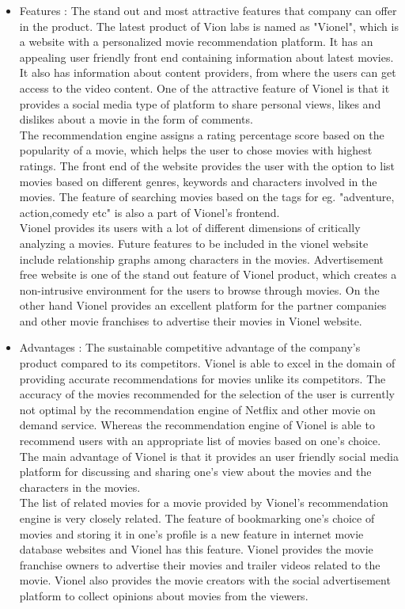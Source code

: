  \begin{itemize}
 
  \item Features : 
  The stand out and most attractive features that company can offer in the product. The latest product of Vion labs is named as  "Vionel", which is a website with a personalized movie recommendation platform. It has an appealing user friendly front end containing information about latest movies. It also has information about content providers, from where the users can get access to the video content. One of the attractive feature of Vionel is that it provides a social media type of platform to share personal views, likes and dislikes about a movie in the form of comments. \\
  The recommendation engine assigns a rating percentage score based on the popularity of a movie, which helps the user to chose movies with highest ratings. The front end of the website provides the user with the option to list movies based on different genres, keywords and characters involved in the movies. The feature of searching movies based on the tags for eg. "adventure, action,comedy etc" is also a part of Vionel's frontend. \\
  Vionel provides its users with a lot of different dimensions of critically analyzing a movies. Future features to be included in the vionel website include relationship graphs among characters in the movies. Advertisement free website is one of the stand out feature of Vionel product, which creates a non-intrusive environment for the users to browse through movies. On the other hand Vionel provides an excellent platform for the partner companies and other movie franchises to advertise their movies in Vionel website.      
      
  \item Advantages : The sustainable competitive advantage of the company's product compared to its competitors. Vionel is able to excel in the domain of providing accurate recommendations for movies unlike its competitors. The accuracy of the movies recommended for the selection of the user is currently not optimal by the recommendation engine of Netflix and other movie on demand service. Whereas the recommendation engine of Vionel is able to recommend users with an appropriate list of movies based on one's choice. The main advantage of Vionel is that it provides an user friendly social media platform for discussing and sharing one's view about the movies and the characters in the movies. \\
  The list of related movies for a movie provided by Vionel's recommendation engine is very closely related. The feature of bookmarking one's choice of movies and storing it in one's profile is a new feature in internet movie database websites and Vionel has this feature. Vionel provides the movie franchise owners to advertise their movies and trailer videos related to the movie. Vionel also provides the movie creators with the social advertisement platform to collect opinions about movies from the viewers.      	   
   

\end{itemize}
